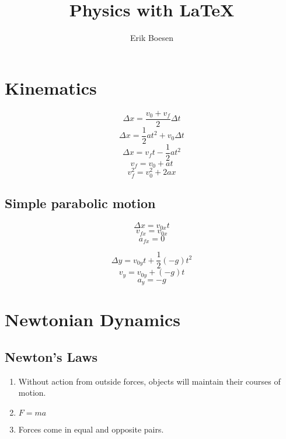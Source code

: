 \documentclass[twocolumn]{article}
\begin{document}
\title{Physics with \LaTeX}
\author{Erik Boesen}
\maketitle

\section*{Kinematics}
$$\Delta x=\frac{v_0+v_f}{2}\Delta t$$
$$\Delta x=\frac{1}{2}at^2+v_0\Delta t$$
$$\Delta x=v_ft-\frac{1}{2}at^2$$
$$v_f=v_0+at$$
$$v_f^2=v_0^2+2ax$$
\subsection*{Simple parabolic motion}
$$\Delta x=v_{0x}t$$
$$v_{fx}=v_{0x}$$
$$a_{fx}=0$$

$$\Delta y=v_{0y}t+\frac{1}{2}(-g)t^2$$
$$v_{y}=v_{0y}+(-g)t$$
$$a_{y}=-g$$

\section*{Newtonian Dynamics}
\subsection{Newton's Laws}
\begin{enumerate}
  \item{Without action from outside forces, objects will maintain their courses of motion.}
  \item{$F=ma$}
  \item{Forces come in equal and opposite pairs.}
\end{enumerate}
\end{document}
